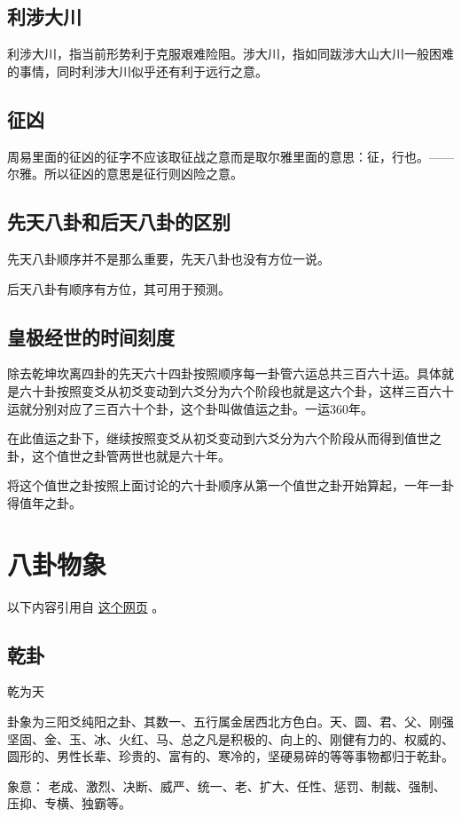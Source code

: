 \documentclass[12pt,oneside]{book}
\begin{document}
\section{利涉大川}
利涉大川，指当前形势利于克服艰难险阻。涉大川，指如同跋涉大山大川一般困难的事情，同时利涉大川似乎还有利于远行之意。

\section{征凶}
周易里面的征凶的征字不应该取征战之意而是取尔雅里面的意思：征，行也。——尔雅。所以征凶的意思是征行则凶险之意。

\section{先天八卦和后天八卦的区别}
先天八卦顺序并不是那么重要，先天八卦也没有方位一说。

后天八卦有顺序有方位，其可用于预测。


\section{皇极经世的时间刻度}
除去乾坤坎离四卦的先天六十四卦按照顺序每一卦管六运总共三百六十运。具体就是六十卦按照变爻从初爻变动到六爻分为六个阶段也就是这六个卦，这样三百六十运就分别对应了三百六十个卦，这个卦叫做值运之卦。一运360年。

在此值运之卦下，继续按照变爻从初爻变动到六爻分为六个阶段从而得到值世之卦，这个值世之卦管两世也就是六十年。

将这个值世之卦按照上面讨论的六十卦顺序从第一个值世之卦开始算起，一年一卦得值年之卦。

\chapter{八卦物象}
以下内容引用自 \href{https://www.douban.com/note/684840565/}{这个网页} 。

\section{乾卦}
乾为天

卦象为三阳爻纯阳之卦、其数一、五行属金居西北方色白。天、圆、君、父、刚强坚固、金、玉、冰、火红、马、总之凡是积极的、向上的、刚健有力的、权威的、圆形的、男性长辈、珍贵的、富有的、寒冷的，坚硬易碎的等等事物都归于乾卦。

象意： 老成、激烈、决断、威严、统一、老、扩大、任性、惩罚、制裁、强制、压抑、专横、独霸等。
\end{document}
